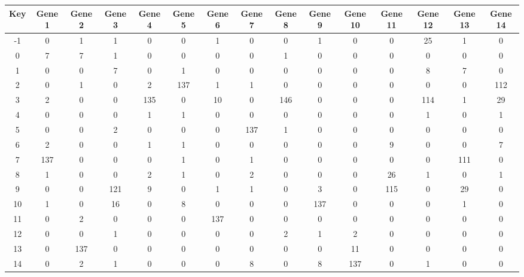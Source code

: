 \begin{tabular}{|c|c|c|c|c|c|c|c|c|c|c|c|c|c|c|}
\hline
Key & Gene 1 & Gene 2 & Gene 3 & Gene 4 & Gene 5 & Gene 6 & Gene 7 & Gene 8 & Gene 9 & Gene 10 & Gene 11 & Gene 12 & Gene 13 & Gene 14 \\
\hline
-1 & 0 & 1 & 1 & 0 & 0 & 1 & 0 & 0 & 1 & 0 & 0 & 25 & 1 & 0 \\
0 & 7 & 7 & 1 & 0 & 0 & 0 & 0 & 1 & 0 & 0 & 0 & 0 & 0 & 0 \\
1 & 0 & 0 & 7 & 0 & 1 & 0 & 0 & 0 & 0 & 0 & 0 & 8 & 7 & 0 \\
2 & 0 & 1 & 0 & 2 & 137 & 1 & 1 & 0 & 0 & 0 & 0 & 0 & 0 & 112 \\
3 & 2 & 0 & 0 & 135 & 0 & 10 & 0 & 146 & 0 & 0 & 0 & 114 & 1 & 29 \\
4 & 0 & 0 & 0 & 1 & 1 & 0 & 0 & 0 & 0 & 0 & 0 & 1 & 0 & 1 \\
5 & 0 & 0 & 2 & 0 & 0 & 0 & 137 & 1 & 0 & 0 & 0 & 0 & 0 & 0 \\
6 & 2 & 0 & 0 & 1 & 1 & 0 & 0 & 0 & 0 & 0 & 9 & 0 & 0 & 7 \\
7 & 137 & 0 & 0 & 0 & 1 & 0 & 1 & 0 & 0 & 0 & 0 & 0 & 111 & 0 \\
8 & 1 & 0 & 0 & 2 & 1 & 0 & 2 & 0 & 0 & 0 & 26 & 1 & 0 & 1 \\
9 & 0 & 0 & 121 & 9 & 0 & 1 & 1 & 0 & 3 & 0 & 115 & 0 & 29 & 0 \\
10 & 1 & 0 & 16 & 0 & 8 & 0 & 0 & 0 & 137 & 0 & 0 & 0 & 1 & 0 \\
11 & 0 & 2 & 0 & 0 & 0 & 137 & 0 & 0 & 0 & 0 & 0 & 0 & 0 & 0 \\
12 & 0 & 0 & 1 & 0 & 0 & 0 & 0 & 2 & 1 & 2 & 0 & 0 & 0 & 0 \\
13 & 0 & 137 & 0 & 0 & 0 & 0 & 0 & 0 & 0 & 11 & 0 & 0 & 0 & 0 \\
14 & 0 & 2 & 1 & 0 & 0 & 0 & 8 & 0 & 8 & 137 & 0 & 1 & 0 & 0 \\
\hline
\end{tabular}